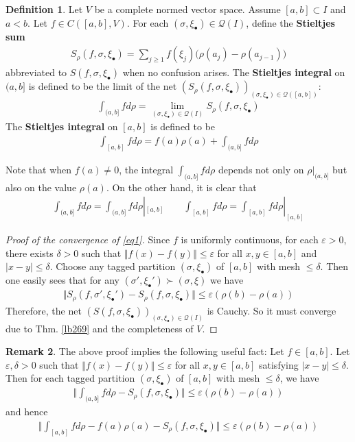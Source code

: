 \documentclass[12pt,b5paper,notitlepage]{article}
\theoremstyle{definition}
\newtheorem{df}{Definition}[subsection]
\newtheorem{rem}[df]{Remark}
\theoremstyle{plain}
\newcommand{\mc}{\mathcal}
\newcommand{\blt}{\bullet}
\newcommand{\eps}{\varepsilon}
\numberwithin{equation}{section}
\begin{document}
\begin{df}\label{lb66}
Let $V$ be a complete normed vector space. Assume $[a,b]\subset I$ and $a<b$. Let $f\in C([a,b],V)$. For each $(\sigma,\xi_\blt)\in\mc Q(I)$, define the \textbf{Stieltjes sum} \index{Sf@$S_\rho(f,\sigma,\xi_\blt)$}
\begin{align*}
S_\rho(f,\sigma,\xi_\blt)=\sum_{j\geq 1}f(\xi_j)\big(\rho(a_j)-\rho(a_{j-1})\big)
\end{align*}
abbreviated to $S(f,\sigma,\xi_\blt)$ when no confusion arises. The \textbf{Stieltjes integral}  on $(a,b]$ is defined to be the limit of the net $(S_\rho(f,\sigma,\xi_\blt))_{(\sigma,\xi_\blt)\in\mc Q([a,b])}$:
\begin{align}\label{eq1}
\int_{(a,b]} fd\rho=\lim_{(\sigma,\xi_\blt)\in\mc Q(I)}S_\rho(f,\sigma,\xi_\blt)
\end{align}
The \textbf{Stieltjes integral} on $[a,b]$ is defined to be
\begin{align}
\int_{[a,b]}fd\rho=f(a)\rho(a)+\int_{(a,b]}fd\rho
\end{align}
\end{df}


Note that when $f(a)\neq0$, the integral $\int_{(a,b]}fd\rho$ depends not only on $\rho|_{(a,b]}$ but also on the value $\rho(a)$. On the other hand, it is clear that
\begin{gather}
\int_{(a,b]}fd\rho=\int_{(a,b]}fd\rho|_{[a,b]}\qquad \int_{[a,b]}fd\rho=\int_{[a,b]}fd\rho|_{[a,b]}
\end{gather}


\begin{proof}[Proof of the convergence of \eqref{eq1}]
Since $f$ is uniformly continuous, for each $\eps>0$, there exists $\delta>0$ such that $\Vert f(x)-f(y)\Vert\leq\eps$ for all $x,y\in[a,b]$ and $|x-y|\leq\delta$. Choose any tagged partition $(\sigma,\xi_\blt)$ of $[a,b]$ with mesh $\leq\delta$. Then one easily sees that for any $(\sigma',\xi_\blt')\succ(\sigma,\xi)$ we have
\begin{align}\label{eq149}
\Vert S_\rho(f,\sigma',\xi_\blt')-S_\rho(f,\sigma,\xi_\blt)\Vert\leq \eps(\rho(b)-\rho(a))
\end{align}
Therefore, the net $(S(f,\sigma,\xi_\blt))_{(\sigma,\xi_\blt)\in\mc Q(I)}$ is Cauchy. So it must converge due to Thm. \ref{lb269} and the completeness of $V$.
\end{proof}

\begin{rem}\label{lb63}
The above proof implies the following useful fact: Let $f\in[a,b]$. Let $\eps,\delta>0$ such that $\Vert f(x)-f(y)\Vert\leq\eps$ for all $x,y\in[a,b]$ satisfying $|x-y|\leq\delta$. Then for each tagged partition $(\sigma,\xi_\blt)$ of $[a,b]$ with mesh $\leq\delta$, we have
\begin{align}
\Big\Vert \int_{(a,b]}fd\rho-S_\rho(f,\sigma,\xi_\blt)\Big\Vert\leq \eps(\rho(b)-\rho(a))
\end{align}
and hence
\begin{align}
\Big\Vert \int_{[a,b]}fd\rho-f(a)\rho(a)-S_\rho(f,\sigma,\xi_\blt)\Big\Vert\leq \eps(\rho(b)-\rho(a))
\end{align}
\end{rem}
\end{document}
